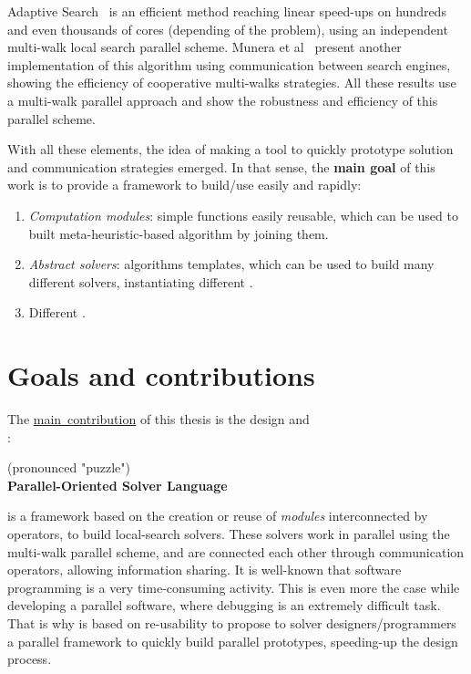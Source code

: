 Adaptive Search~\cite{Diaz} is an efficient method reaching linear speed-ups on hundreds and even thousands of cores (depending of the problem), using an independent multi-walk local search parallel scheme. Munera et al~\cite{Munera} present another implementation of this algorithm using communication between search engines, showing the efficiency of cooperative multi-walks strategies. All these results use a multi-walk parallel approach and show the robustness and efficiency of this parallel scheme. %

With all these elements, the idea of making a tool to quickly prototype solution and communication strategies emerged. In that sense, the \textbf{main goal} of this work is to provide a framework to build/use easily and rapidly:
\begin{enumerate}
\item \textit{Computation modules}: simple functions easily reusable, which can be used to built meta-heuristic-based algorithm by joining them.
\item \textit{Abstract solvers}: algorithms templates, which can be used to build many different solvers, instantiating different \oms.
\item Different \comstrs.
\end{enumerate} 

\section{Goals and contributions}

The \underline{main~contribution} of this thesis is the design and \hfill \\: 
\begin{center}
\posl{} (pronounced "puzzle")\\
\textbf{Parallel-Oriented Solver Language}
\end{center}
\posl{} is a framework based on the creation or reuse of \textit{modules} interconnected by operators, to build local-search solvers. These solvers work in parallel using the multi-walk parallel scheme, and are connected each other through communication operators, allowing information sharing. It is well-known that software programming is a very time-consuming activity. This is even more the case while developing a parallel software, where debugging is an extremely difficult task. That is why \posl{} is based on re-usability to propose to \csp{} solver designers/programmers a parallel framework to quickly build parallel prototypes, speeding-up the design process.

